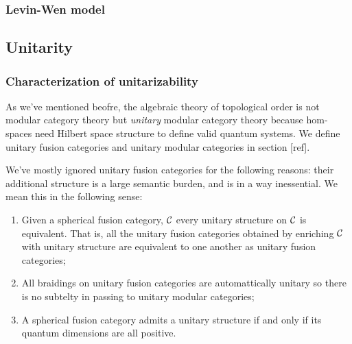 \subsubsection{Levin-Wen model}





\subsection{Unitarity}

\subsubsection{Characterization of unitarizability}


As we've mentioned beofre, the algebraic theory of topological order is not modular category theory but \textit{unitary} modular category theory because hom-spaces need Hilbert space structure to define valid quantum systems. We define unitary fusion categories and unitary modular categories in section [ref].

We've mostly ignored unitary fusion categories for the following reasons: their additional structure is a large semantic burden, and is in a way inessential. We mean this in the following sense:

\begin{enumerate}
\item Given a spherical fusion category, ${\mathcal C}$ every unitary structure on ${\mathcal C}$ is equivalent. That is, all the unitary fusion categories obtained by enriching ${\mathcal C}$ with unitary structure are equivalent to one another as unitary fusion categories;

\item All braidings on unitary fusion categories are automattically unitary so there is no subtelty in passing to unitary modular categories;

\item A spherical fusion category admits a unitary structure if and only if its quantum dimensions are all positive.
\end{enumerate}

